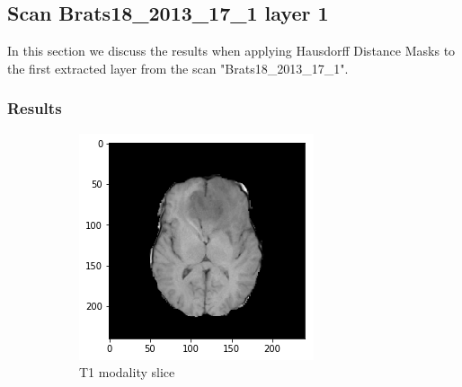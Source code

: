 \subsection{Scan Brats18\_2013\_17\_1 layer 1}
In this section we discuss the results when applying Hausdorff Distance Masks to the first extracted layer from the scan "Brats18\_2013\_17\_1".

\subsubsection{Results}

\begin{figure}[H]
    \centering
    \begin{subfigure}[t]{.4\textwidth}
        \centering
        \includegraphics[width=\linewidth]{chapters/06_hdm/c_Brats18_2013_17_1_L1/41.png}
        \caption{T1 modality slice}
    \end{subfigure}\hspace{1cm}%
    \begin{subfigure}[t]{.4\textwidth}
        \centering

\end{subfigure}
\end{figure}

